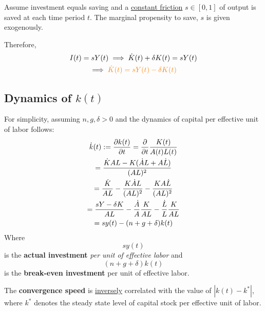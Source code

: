 \documentclass[11pt]{article}
\begin{document}
			\begin{assumption}
				Assume investment equals saving and a \ul{constant friction} $s \in [0, 1]$ of output is saved at each time period $t$. The marginal propensity to save, $s$ is given exogenously.
			\end{assumption}
			
			\par Therefore,
			\begin{gather}
				I(t) = sY(t) \implies \dot{K}(t) + \delta K(t) = sY(t) \\
				\implies \textcolor{orange}{
					\dot{K}(t) = sY(t) - \delta K(t)
					}
			\end{gather}
			
			\subsection{Dynamics of $k(t)$}
				\par For simplicity, assuming $n, g, \delta > 0$ and the dynamics of capital per effective unit of labor follows: 
				\begin{gather}
					\dot{k}(t) := \frac{\partial{k(t)}}{\partial{t}} = \frac{\partial{}}{\partial{t}} \frac{K(t)}{A(t)L(t)} \\
					= \frac{\dot{K}AL - K(\dot{A}L + A\dot{L})}{(AL)^2} \\
					= \frac{\dot{K}}{AL} - \frac{K\dot{A}L}{(AL)^2} - \frac{K A\dot{L}}{(AL)^2} \\
					= \frac{sY - \delta K}{AL} - \frac{\dot{A}}{A}\frac{K}{AL} - \frac{\dot{L}}{L} \frac{K}{AL} \\
					= sy(t) - (n + g + \delta) k(t)
				\end{gather}
				Where \[s y(t)\] is the \textbf{actual investment} \emph{per unit of effective labor} and \[(n + g + \delta) k(t)\] is the \textbf{break-even investment} per unit of effective labor.
				
				\begin{remark}
					The \textbf{convergence speed} is \ul{inversely} correlated with the value of $| k(t) - k^* |$, where $k^*$ denotes the steady state level of capital stock per effective unit of labor.
				\end{remark}
				
\end{document}
